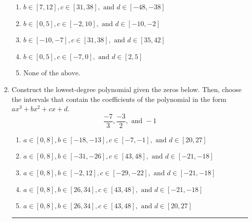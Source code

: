 \documentclass[14pt]{extbook}
\newcommand{\litem}[1]{\item#1\hspace*{-1cm}\rule{\textwidth}{0.4pt}}
\begin{document}
\begin{enumerate}
{\begin{enumerate}[label=\Alph*.]
\item \( b \in [7, 12], c \in [31, 38], \text{ and } d \in [-48, -38] \)
\item \( b \in [0, 5], c \in [-2, 10], \text{ and } d \in [-10, -2] \)
\item \( b \in [-10, -7], c \in [31, 38], \text{ and } d \in [35, 42] \)
\item \( b \in [0, 5], c \in [-7, 0], \text{ and } d \in [2, 5] \)
\item \( \text{None of the above.} \)

\end{enumerate} }
\litem{
Construct the lowest-degree polynomial given the zeros below. Then, choose the intervals that contain the coefficients of the polynomial in the form $ax^3+bx^2+cx+d$.\[ \frac{-7}{3}, \frac{-3}{2}, \text{ and } -1 \]\begin{enumerate}[label=\Alph*.]
\item \( a \in [0, 8], b \in [-18, -13], c \in [-7, -1], \text{ and } d \in [20, 27] \)
\item \( a \in [0, 8], b \in [-31, -26], c \in [43, 48], \text{ and } d \in [-21, -18] \)
\item \( a \in [0, 8], b \in [-2, 12], c \in [-29, -22], \text{ and } d \in [-21, -18] \)
\item \( a \in [0, 8], b \in [26, 34], c \in [43, 48], \text{ and } d \in [-21, -18] \)
\item \( a \in [0, 8], b \in [26, 34], c \in [43, 48], \text{ and } d \in [20, 27] \)


\end{enumerate}}
\end{enumerate}
\end{document}
